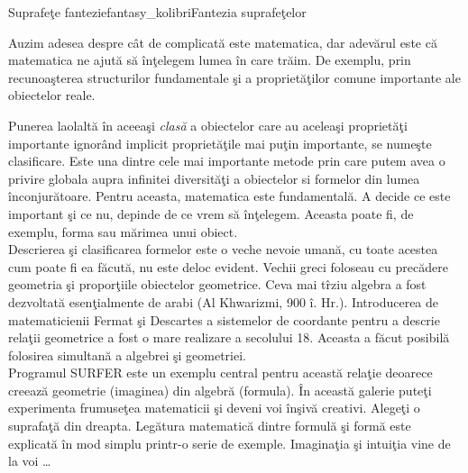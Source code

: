 
\begin{surferIntroPage}{Suprafe\c{t}e fantezie}{fantasy_kolibri}{Fantezia suprafe\c telor}

Auzim adesea despre c\^at de complicat\u a este matematica, dar adev\u arul este c\u a matematica ne ajut\u a
s\u a \^in\c telegem lumea \^in care tr\u aim.
De exemplu, prin recunoa\c sterea structurilor fundamentale \c si a propriet\u a\c tilor comune importante ale
obiectelor reale.

Punerea laolalt\u a \^in aceea\c si \textit{clas\u a} a obiectelor care au acelea\c si propriet\u a\c ti importante
ignor\^and implicit propriet\u a\c tile mai pu\c tin importante, se nume\c ste clasificare.
Este una dintre cele mai importante metode prin care putem avea o privire globala aupra infinitei diversit\u a\c ti
a obiectelor si formelor din lumea \^inconjur\u atoare. Pentru aceasta, matematica este fundamental\u a.
A decide ce este important \c si ce nu, depinde de ce vrem s\u a \^in\c telegem. Aceasta poate fi, de exemplu, forma
sau m\u arimea unui obiect.
\\

\vspace{0.4cm}
Descrierea \c si clasificarea formelor este o veche nevoie uman\u a, cu toate acestea cum poate fi ea f\u acut\u a,
nu este deloc evident. Vechii greci foloseau cu prec\u adere geometria \c si propor\c tiile obiectelor geometrice.
Ceva mai t\^rziu algebra a fost dezvoltat\u a esen\c tialmente de arabi (Al Khwarizmi, 900 \^i. Hr.).
Introducerea de matematicienii Fermat \c si Descartes a sistemelor de coordante pentru a
descrie rela\c tii geometrice a fost o mare realizare a secolului 18. Aceasta a f\u acut posibil\u a folosirea
simultan\u a a algebrei \c si geometriei.
\\

\vspace{0.4cm}
Programul SURFER este un exemplu central pentru aceast\u a rela\c tie deoarece creeaz\u a geometrie (imaginea)
din algebr\u a (formula).
\^In aceast\u a galerie pute\c ti experimenta frumuse\c tea matematicii \c si deveni voi \^in\c siv\u a creativi.
Alege\c ti o suprafa\c t\u a din dreapta. Leg\u atura matematic\u a dintre formul\u a \c si form\u a este
explicat\u a \^in mod simplu printr-o serie de exemple.
Imagina\c tia \c si intui\c tia vine de la voi  \dots

\end{surferIntroPage}